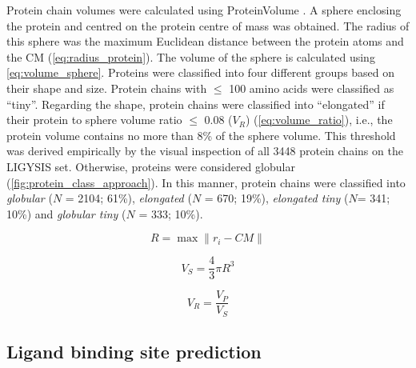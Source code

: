 Protein chain volumes were calculated using ProteinVolume \cite{CHEN_2015_PROTEINVOLUME}. A sphere enclosing the protein and centred on the protein centre of mass was obtained. The radius of this sphere was the maximum Euclidean distance between the protein atoms and the CM (\autoref{eq:radius_protein}). The volume of the sphere is calculated using \autoref{eq:volume_sphere}. Proteins were classified into four different groups based on their shape and size. Protein chains with $\leq$ 100 amino acids were classified as ``tiny''. Regarding the shape, protein chains were classified into ``elongated'' if their protein to sphere volume ratio $\leq$ 0.08 ($V_R$) (\autoref{eq:volume_ratio}), i.e., the protein volume contains no more than 8\% of the sphere volume. This threshold was derived empirically by the visual inspection of all 3448 protein chains on the LIGYSIS set. Otherwise, proteins were considered globular (\autoref{fig:protein_class_approach}). In this manner, protein chains were classified into \textit{globular} ($N$ = 2104; 61\%), \textit{elongated} ($N$ = 670; 19\%), \textit{elongated tiny} ($N$= 341; 10\%) and \textit{globular tiny} ($N$ = 333; 10\%).

\begin{equation}
R = \max \| r_i - CM \|
\label{eq:radius_protein}
\end{equation}

\begin{equation}
V_{S} = \frac{4}{3} \pi R^3
\label{eq:volume_sphere}
\end{equation}

\begin{equation}
V_R = \frac{V_{P}}{V_{S}}
\label{eq:volume_ratio}
\end{equation}

\FloatBarrier

\subsection{Ligand binding site prediction}


